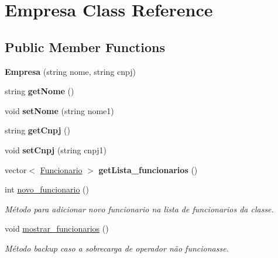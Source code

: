 \hypertarget{classEmpresa}{}\section{Empresa Class Reference}
\label{classEmpresa}
\subsection*{Public Member Functions}
\begin{DoxyCompactItemize}
\item 
\mbox{\label{classEmpresa_a92762d2b8a30c8cfd9ac2ad235f491b1}} 
{\bfseries Empresa} (string nome, string cnpj)
\item 
\mbox{\label{classEmpresa_a9dba7316e0e0449abe9c9ec7015927e1}} 
string {\bfseries get\+Nome} ()
\item 
\mbox{\label{classEmpresa_a092761d57a5b02158dd63581fcb16a44}} 
void {\bfseries set\+Nome} (string nome1)
\item 
\mbox{\label{classEmpresa_a7289c123e5515521179f96a2b5656745}} 
string {\bfseries get\+Cnpj} ()
\item 
\mbox{\label{classEmpresa_ada3b928c6b2a3525616b8e3129ea2d40}} 
void {\bfseries set\+Cnpj} (string cnpj1)
\item 
\mbox{\label{classEmpresa_a740a11e864fb528c196db8ca2e111d4b}} 
vector$<$ \hyperlink{classFuncionario}{Funcionario} $>$ {\bfseries get\+Lista\+\_\+funcionarios} ()
\item 
int \hyperlink{classEmpresa_a2bc3f3fc539f62491c5ba59c44e37723}{novo\+\_\+funcionario} ()
\begin{DoxyCompactList}\small\item\em Método para adicionar novo funcionario na lista de funcionarios da classe. \end{DoxyCompactList}\item 
\mbox{\label{classEmpresa_a0c54d6396db9722bd81adc055f456843}} 
void \hyperlink{classEmpresa_a0c54d6396db9722bd81adc055f456843}{mostrar\+\_\+funcionarios} ()
\begin{DoxyCompactList}\small\item\em Método backup caso a sobrecarga de operador não funcionasse. \end{DoxyCompactList}\item 

\end{DoxyCompactItemize}
